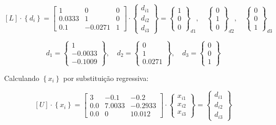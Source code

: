 \documentclass[12pt]{article}
\begin{document}
\[
[L] \cdot \left\{ d_{i} \right\} = \begin{bmatrix}
    1 & 0 & 0 \\
    0.0333 & 1 & 0 \\
    0.1 & -0.0271 & 1
  \end{bmatrix}
  \cdot
\begin{Bmatrix}
    d_{i1} \\
    d_{i2} \\
    d_{i3}
  \end{Bmatrix} =
  \begin{Bmatrix}
    1 \\
    0 \\
    0
  \end{Bmatrix}_{d1},
  \quad
\begin{Bmatrix}
    0 \\
    1 \\
    0
  \end{Bmatrix}_{d2},
  \quad
\begin{Bmatrix}
    0 \\
    0 \\
    1
  \end{Bmatrix}_{d3}
\]

\[
d_1 = \begin{Bmatrix}
    1 \\
    -0.0033 \\
    -0.1009
\end{Bmatrix},
\quad
d_2 = \begin{Bmatrix}
    0 \\
    1 \\
    0.0271
\end{Bmatrix},
\quad
d_3 = \begin{Bmatrix}
    0 \\
    0 \\
    1
\end{Bmatrix}
\]
\vspace{0.75cm}

Calculando $ \left\{x_{i} \right\}$ por substituição regressiva:

\[
[U] \cdot \left\{ x_{i} \right\} = \begin{bmatrix}
    3 & -0.1 & -0.2 \\
    0.0 & 7.0033 & -0.2933 \\
    0.0 & 0 & 10.012
  \end{bmatrix}
  \cdot
\begin{Bmatrix}
    x_{i1} \\
    x_{i2} \\
    x_{i3}
  \end{Bmatrix} =
  \begin{Bmatrix}
    d_{i1} \\
    d_{i2} \\
    d_{i3}
  \end{Bmatrix}
\]
\end{document}
